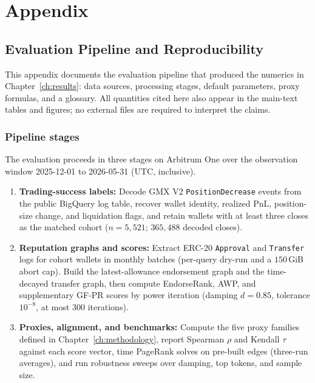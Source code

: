 \clearpage
\chapter{Appendix}
\label{ch:appendix}

\renewcommand{\dissertationSubheading}[2][]{%
  \phantomsection
  \subsection{#2}%
  \if\relax\detokenize{#1}\relax\else\label{#1}\fi
}
\renewcommand{\dissertationSubsubheading}[2][]{%
  \phantomsection
  \subsubsection{#2}%
  \if\relax\detokenize{#1}\relax\else\label{#1}\fi
}

\section{Evaluation Pipeline and Reproducibility}
\label{ch:appendix-eval}

This appendix documents the evaluation pipeline that produced the numerics in Chapter~\ref{ch:results}: data sources, processing stages, default parameters, proxy formulas, and a glossary. All quantities cited here also appear in the main-text tables and figures; no external files are required to interpret the claims.

\dissertationSubheading[sec:pipeline-stages]{Pipeline stages}

The evaluation proceeds in three stages on Arbitrum One over the observation window 2025-12-01 to 2026-05-31 (UTC, inclusive).

\begin{enumerate}
\item \textbf{Trading-success labels:} Decode GMX V2 \texttt{PositionDecrease} events from the public BigQuery log table, recover wallet identity, realized PnL, position-size change, and liquidation flags, and retain wallets with at least three closes as the matched cohort ($n=5{,}521$; $365{,}488$ decoded closes).
\item \textbf{Reputation graphs and scores:} Extract ERC-20 \texttt{Approval} and \texttt{Transfer} logs for cohort wallets in monthly batches (per-query dry-run and a $150$\,GiB abort cap). Build the latest-allowance endorsement graph and the time-decayed transfer graph, then compute EndorseRank, AWP, and supplementary GF-PR scores by power iteration (damping $d=0.85$, tolerance $10^{-8}$, at most $300$ iterations).
\item \textbf{Proxies, alignment, and benchmarks:} Compute the five proxy families defined in Chapter~\ref{ch:methodology}, report Spearman $\rho$ and Kendall $\tau$ against each score vector, time PageRank solves on pre-built edges (three-run averages), and run robustness sweeps over damping, top tokens, and sample size.
\end{enumerate}

